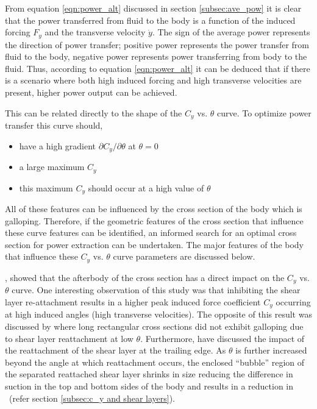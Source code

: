 From equation \ref{eqn:power_alt} discussed in section \ref{subsec:ave_pow} it is clear that the power transferred from fluid to the body is a function of the induced forcing $F_y$ and the transverse velocity $\dot{y}$. The sign of the average power represents the direction of power transfer; positive power represents the power transfer from fluid to the body, negative power represents power transferring from body to the fluid. Thus, according to equation \ref{eqn:power_alt} it can be deduced that if there is a scenario where both high induced forcing and high transverse velocities are present, higher power output can be achieved.

This can be related directly to the shape of the $C_y$ vs. $\theta$ curve. To optimize power
transfer this curve should,

\begin{itemize}
\item have a high gradient $\partial C_y/\partial \theta$ at
  $\theta = 0$
\item a large maximum $C_y$
\item this maximum $C_y$ should occur at a high value of $\theta$
\end{itemize}

All of these features can be influenced by the cross section of the
body which is galloping. Therefore, if the geometric features of the
cross section that influence these curve features can be identified,
an informed search for an optimal cross section for power extraction
can be undertaken. The major features of the body that influence these
$C_y$ vs. $\theta$ curve parameters are discussed below.

\citet{Luo1994}, showed that the afterbody of the cross section has a direct impact on the $C_y$ vs. $\theta$ curve. One interesting observation of this study was that inhibiting the shear layer re-attachment results in a higher peak induced force coefficient $C_y$ occurring at high induced angles (high transverse velocities). The opposite of this result was discussed by \citet{Robertson2003} where long rectangular cross sections did not exhibit galloping due to shear layer reattachment at low $\theta$. Furthermore, \citet{Luo1994} have discussed the impact of the reattachment of the shear layer at the trailing edge. As $\theta$ is further increased beyond the angle at which reattachment occurs, the enclosed ``bubble'' region of the separated reattached shear layer shrinks in size reducing the difference in suction in the top and bottom sides of the body and results in a reduction in \cy\ (refer section \ref{subsec:c_y and shear layers}). 

